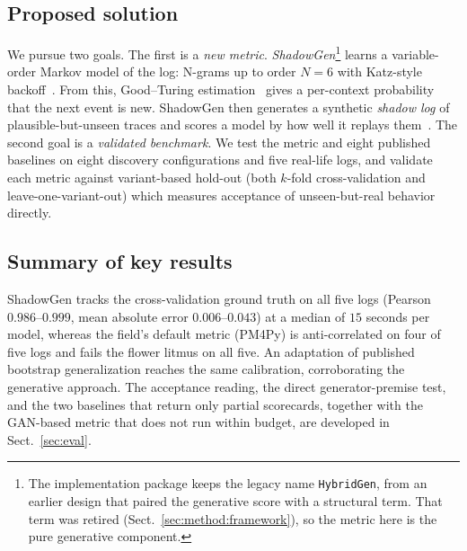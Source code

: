 \documentclass[runningheads]{llncs}
\newcommand{\chg}[1]{\textcolor{chgblue}{#1}}
\begin{document}
\subsection{Proposed solution}
We pursue two goals. The first is a \emph{new metric}. \emph{ShadowGen}\footnote{The implementation package keeps the legacy name \texttt{HybridGen}, from an earlier design that paired the generative score with a structural term. That term was retired (Sect.~\ref{sec:method:framework}), so the metric here is the pure generative component.} learns a variable-order Markov model of the log: N-grams up to order $N{=}6$ with Katz-style backoff~\cite{katz1987}. From this, Good--Turing estimation~\cite{gale1995gt} gives a per-context probability that the next event is new. ShadowGen then generates a synthetic \emph{shadow log} of plausible-but-unseen traces and scores a model by how well it replays them~\cite{rozinat2008conformance}. The second goal is a \emph{validated benchmark}. We test the metric \chg{and eight published baselines on eight discovery configurations and five real-life logs}, and validate each metric against variant-based hold-out (both $k$-fold cross-validation and leave-one-variant-out) which measures acceptance of unseen-but-real behavior directly.

\subsection{Summary of key results}
\chg{ShadowGen tracks the cross-validation ground truth on all five logs (Pearson $0.986$--$0.999$, mean absolute error $0.006$--$0.043$) at a median of $15$ seconds per model, whereas the field's default metric (PM4Py) is anti-correlated on four of five logs and fails the flower litmus on all five. An adaptation of published bootstrap generalization reaches the same calibration, corroborating the generative approach. The acceptance reading, the direct generator-premise test, and the two baselines that return only partial scorecards, together with the GAN-based metric that does not run within budget, are developed in Sect.~\ref{sec:eval}.}
\end{document}
